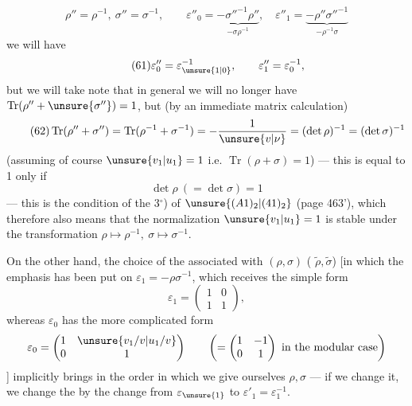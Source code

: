 


\[
\tag{60}
\rho''=\rho^{-1},\ \sigma''=\sigma^{-1},\qquad
\varepsilon''_0=\underbrace{-\sigma''^{-1}\rho''}_{-\sigma\rho^{-1}},\quad
\varepsilon''_1=\underbrace{-\rho''\sigma''^{-1}}_{-\rho^{-1}\sigma}
\]
we will have
\[
\tag{61}
\varepsilon''_0=\varepsilon_{\unsure{1|0}}^{-1},\qquad
\varepsilon''_1=\varepsilon_0^{-1},
\]
but we will take note that in general we will no longer have $\operatorname{Tr}(\rho''+\unsure{\sigma''})=1$, but (by an immediate matrix calculation)
\[
\tag{62}
\operatorname{Tr}(\rho''+\sigma'')
=\operatorname{Tr}(\rho^{-1}+\sigma^{-1})
=-\frac{1}{\unsure{v|\nu}}
=(\det\rho)^{-1}=(\det\sigma)^{-1}
\]
(assuming of course  $\unsure{v_1|u_1}=1$ i.e. $\operatorname{Tr}(\rho+\sigma)=1$)
--- this is equal to 1 only if
\[
\tag{63}
\det\rho\ (=\det\sigma)=1
\]
--- this is the condition of the  3$^\circ$) of $\unsure{(A1)_2|(41)_2}$ (page 463'), which therefore also means that the normalization $\unsure{v_1|u_1}=1$ is stable under the transformation $\rho\mapsto\rho^{-1},\ \sigma\mapsto\sigma^{-1}$.

On the other hand, the choice of the \uline{} associated with $(\rho,\sigma)$ ( $\widetilde\rho,\widetilde\sigma$) [in which the emphasis has been put on $\varepsilon_1=-\rho\sigma^{-1}$, which receives the simple form
\[
\varepsilon_1=\begin{pmatrix}1&0\\1&1\end{pmatrix},
\]
whereas $\varepsilon_0$  has the more complicated form
\[
\varepsilon_0=\begin{pmatrix}1&\unsure{v_1/v|u_1/v}\\0&1\end{pmatrix}
\qquad\left(=\begin{pmatrix}1&-1\\0&1\end{pmatrix}\text{ in the modular case}\right)
\]
] implicitly brings in the order in which we give ourselves $\rho,\sigma$ --- if we change it, we change the  by the change from $\varepsilon_{\unsure{1}}$ to $\varepsilon'_1=\varepsilon_1^{-1}$.

